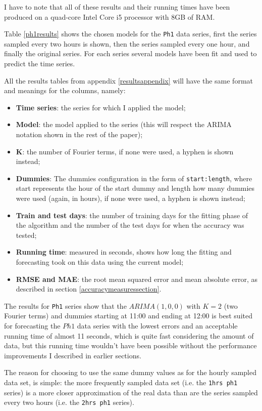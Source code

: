 \documentclass[12pt,a4paper,titlepage]{report}
\begin{document}
I have to note that all of these results and their running times have been produced on a quad-core Intel Core i5 processor with 8GB of RAM.

Table \ref{ph1results} shows the chosen models for the \texttt{Ph1} data series, first the series sampled every two hours is shown, then the series sampled every one hour, and finally the original series. For each series several models have been fit and used to predict the time series.

All the results tables from appendix \ref{resultsappendix} will have the same format and meanings for the columns, namely:
\begin{itemize}
    \item \textbf{Time series}: the series for which I applied the model;
    \item \textbf{Model}: the model applied to the series (this will respect the ARIMA notation shown in the rest of the paper);
    \item \textbf{K}: the number of Fourier terms, if none were used, a hyphen is shown instead;
    \item \textbf{Dummies}: The dummies configuration in the form of \texttt{start:length}, where start represents the hour of the start dummy and length how many dummies were used (again, in hours), if none were used, a hyphen is shown instead;
    \item \textbf{Train and test days}: the number of training days for the fitting phase of the algorithm and the number of the test days for when the accuracy was tested;
    \item \textbf{Running time}: measured in seconds, shows how long the fitting and forecasting took on this data using the current model;
    \item \textbf{RMSE and MAE}: the root mean squared error and mean absolute error, as described in section \ref{accuracymeasuressection}.
\end{itemize}

The results for \texttt{Ph1} series show that the $ ARIMA(1, 0, 0) $ with $ K=2 $ (two Fourier terms) and dummies starting at 11:00 and ending at 12:00 is best suited for forecasting the $ Ph1 $ data series with the lowest errors and an acceptable running time of almost 11 seconds, which is quite fast considering the amount of data, but this running time wouldn't have been possible without the performance improvements I described in earlier sections.

The reason for choosing to use the same dummy values as for the hourly sampled data set, is simple: the more frequently sampled data set (i.e. the \texttt{1hrs ph1} series) is a more closer approximation of the real data than are the series sampled every two hours (i.e. the \texttt{2hrs ph1} series).
\end{document}
